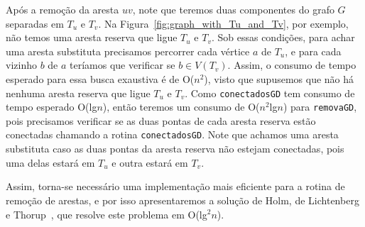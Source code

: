 Após a remoção da aresta $uv$, note que teremos duas componentes do grafo $G$ separadas em $T_u$ e $T_v$. Na Figura~\ref{fig:graph_with_Tu_and_Tv}, por exemplo, não temos uma aresta reserva que ligue $T_u$ e $T_v$. Sob essas condições, para achar uma aresta substituta precisamos percorrer cada vértice $a$ de $T_u$, e para cada vizinho $b$ de $a$ teríamos que verificar se $b \in V(T_v)$. Assim, o consumo de tempo esperado para essa busca exaustiva é de O($n^2$), visto que supusemos que não há nenhuma aresta reserva que ligue $T_u$ e $T_v$. Como \texttt{conectadosGD} tem consumo de tempo esperado O(lg$n$), então teremos um consumo de O($n^2$lg$n$) para \texttt{removaGD}, pois precisamos verificar se as duas pontas de cada aresta reserva estão conectadas chamando a rotina \texttt{conectadosGD}. Note que achamos uma aresta substituta caso as duas pontas da aresta reserva não estejam conectadas, pois uma delas estará em $T_u$ e outra estará em $T_v$.

Assim, torna-se necessário uma implementação mais eficiente para a rotina de remoção de arestas, e por isso apresentaremos a solução de Holm, de Lichtenberg e Thorup~\cite{jacob_holm}, que resolve este problema em O(lg$^2n$).

